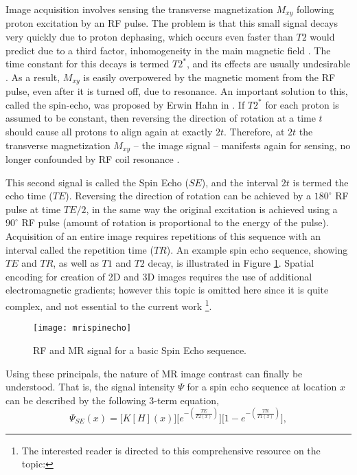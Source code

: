 Image acquisition involves sensing the transverse magnetization $M_{xy}$
following proton excitation by an RF pulse.
The problem is that this small signal decays very quickly due to proton dephasing,
which occurs even faster than $T2$ would predict due to a third factor,
inhomogeneity in the main magnetic field \cite{Chavhan2009}.
The time constant for this decays is termed $T2^*$,
and its effects are usually undesirable \cite{Chavhan2009}.
As a result, $M_{xy}$ is easily overpowered by the magnetic moment from the RF pulse,
even after it is turned off, due to resonance.
An important solution to this, called the spin-echo,
was proposed by Erwin Hahn in \citeyear{Hahn1950} \cite{Hahn1950}.
If $T2^*$ for each proton is assumed to be constant, then reversing the direction of rotation
at a time $t$ should cause all protons to align again at exactly $2t$.
Therefore, at $2t$ the transverse magnetization $M_{xy}$ -- the image signal -- 
manifests again for sensing, no longer confounded by RF coil resonance \cite{Hahn1950}.
\par
This second signal is called the Spin Echo ($SE$),
and the interval $2t$ is termed the echo time ($TE$).
Reversing the direction of rotation can be achieved by a $180^{\circ}$ RF pulse
at time $TE/2$, in the same way the original excitation is achieved using a $90^{\circ}$
RF pulse (amount of rotation is proportional to the energy of the pulse).
Acquisition of an entire image requires repetitions of this sequence with an interval
called the repetition time ($TR$).
An example spin echo sequence, showing $TE$ and $TR$, as well as $T1$ and $T2$ decay,
is illustrated in Figure \ref{fig:mrispinecho}.
Spatial encoding for creation of 2D and 3D images
requires the use of additional electromagnetic gradients; 
however this topic is omitted here since it is quite complex, and not essential to the current work%
\footnote{The interested reader is directed to this comprehensive resource on the topic:
  }.
\par
\begin{figure}
  \centering\texttt{[image: mrispinecho]}
  \caption{RF and MR signal for a basic Spin Echo sequence.}
  \label{fig:mrispinecho}
\end{figure}
Using these principals, the nature of MR image contrast can finally be understood.
That is, the signal intensity $\Psi$ for a spin echo sequence at location $x$
can be described by the following 3-term equation,
\begin{equation}\label{eq:MRI-SE}
  \Psi_{SE}(x) = \bigg[K [H](x)\bigg]
    \bigg[e^{-\left(\frac{TE}{T2(x)}\right)}\bigg]
    \bigg[1 - e^{-\left(\frac{TR}{T1(x)}\right)}\bigg],
\end{equation}
